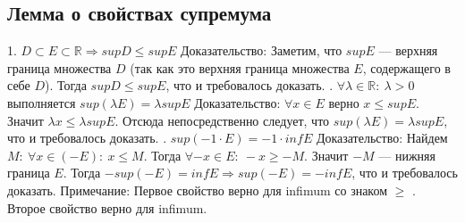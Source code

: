 \subsection{Лемма о свойствах супремума}
    1. $D \subset E \subset \mathbb{R} \Rightarrow supD \leq supE$
    \newline
    \newline
    Доказательство:
    \newline
    Заметим, что $supE$ --- верхняя граница множества $D$ (так как это верхняя граница множества $E$, содержащего в себе $D$). Тогда $supD \leq supE$, что и требовалось доказать.
    \newline
    . $\forall \lambda \in \mathbb{R}: \ \lambda > 0$ выполняется $sup(\lambda E) = \lambda supE$
    \newline
    \newline
    Доказательство:
    \newline
    $\forall x \in E$ верно $x \leq supE$. Значит $\lambda x \leq \lambda supE$. Отсюда непосредственно следует, что $sup(\lambda E) = \lambda supE$, что и требовалось доказать.
    \newline
    . $sup(-1 \cdot E) = -1 \cdot infE$
    \newline
    \newline
    Доказательство:
    \newline
    Найдем $M: \ \forall x \in (-E) : \ x \leq M$. Тогда $\forall -x \in E : \ -x \geq -M$. Значит $-M$ --- нижняя граница $E$. Тогда $-sup(-E) = infE \Rightarrow sup(-E) = -infE$, что и требовалось доказать.
    \newline
    \newline
    Примечание:
    \newline
    Первое свойство верно для infimum со знаком $\geq$  .
    \newline
    Второе свойство верно для infimum.
    
\newpage
